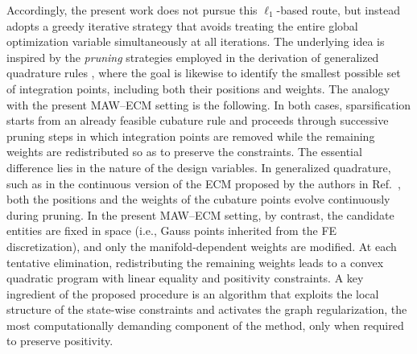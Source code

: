 \documentclass[preprint,10pt]{elsarticle}  %
\begin{document}
Accordingly, the present work does not pursue this \(\ell_1\)-based route, but
instead adopts a greedy iterative strategy that avoids treating the entire
global optimization variable simultaneously at all iterations. The underlying idea is inspired by
the \emph{pruning} strategies employed in the derivation of generalized
quadrature rules \cite{bremer2010nonlinear,xiao2010numerical,hernandez2024cecm},
where the goal
is likewise to identify the smallest possible set of integration points,
including both their positions and weights.   The analogy with the present MAW--ECM setting is the following. In both
cases, sparsification starts from an already feasible cubature rule and
proceeds through successive pruning steps in which integration points are
removed while the remaining weights are redistributed so as to preserve the
constraints.
The essential difference lies in the nature of the design variables. In
generalized quadrature, such as in the  continuous version of the ECM proposed by the authors in Ref.~\cite{hernandez2024cecm},   both the positions and the weights of the
cubature points evolve continuously during pruning. In the present MAW--ECM
setting, by contrast, the candidate entities are fixed in space  (i.e., Gauss points inherited
from the FE discretization), and only the manifold-dependent weights are
modified.   At each tentative elimination, redistributing the remaining weights leads
to a convex quadratic program with linear equality and positivity
constraints. A key ingredient of the proposed procedure is an algorithm
that exploits the local structure of the state-wise constraints and
activates the graph regularization, the most computationally demanding
component of the method, only when required to preserve positivity.

%



%
%
%
\end{document}
